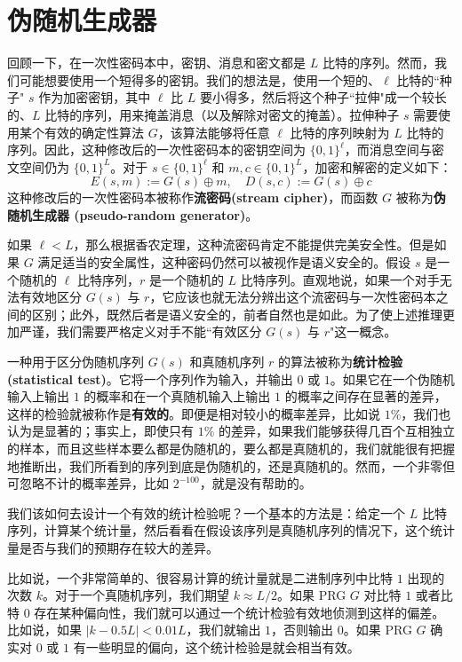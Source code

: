 \section{伪随机生成器}\label{sec:3-1}

回顾一下，在一次性密码本中，密钥、消息和密文都是 $L$ 比特的序列。然而，我们可能想要使用一个短得多的密钥。我们的想法是，使用一个短的、$\ell$ 比特的``种子" $s$ 作为加密密钥，其中 $\ell$ 比 $L$ 要小得多，然后将这个种子``拉伸"成一个较长的、$L$ 比特的序列，用来掩盖消息（以及解除对密文的掩盖）。拉伸种子 $s$ 需要使用某个有效的确定性算法 $G$，该算法能够将任意 $\ell$ 比特的序列映射为 $L$ 比特的序列。因此，这种修改后的一次性密码本的密钥空间为 $\{0,1\}^\ell$，而消息空间与密文空间仍为 $\{0,1\}^L$。对于 $s\in\{0,1\}^\ell$ 和 $m,c\in\{0,1\}^L$，加密和解密的定义如下：
\[
E(s,m):=G(s)\oplus m,\quad
D(s,c):=G(s)\oplus c
\]
这种修改后的一次性密码本被称作\textbf{流密码(stream cipher)}，而函数 $G$ 被称为\textbf{伪随机生成器 (pseudo-random generator)}。

如果 $\ell<L$，那么根据香农定理，这种流密码肯定不能提供完美安全性。但是如果 $G$ 满足适当的安全属性，这种密码仍然可以被视作是语义安全的。假设 $s$ 是一个随机的 $\ell$ 比特序列，$r$ 是一个随机的 $L$ 比特序列。直观地说，如果一个对手无法有效地区分 $G(s)$ 与 $r$，它应该也就无法分辨出这个流密码与一次性密码本之间的区别；此外，既然后者是语义安全的，前者自然也是如此。为了使上述推理更加严谨，我们需要严格定义对手不能``有效区分 $G(s)$ 与 $r$"这一概念。

一种用于区分伪随机序列 $G(s)$ 和真随机序列 $r$ 的算法被称为\textbf{统计检验(statistical test)}。它将一个序列作为输入，并输出 $0$ 或 $1$。如果它在一个伪随机输入上输出 $1$ 的概率和在一个真随机输入上输出 $1$ 的概率之间存在显著的差异，这样的检验就被称作是\textbf{有效的}。即便是相对较小的概率差异，比如说 $1\%$，我们也认为是显著的；事实上，即使只有 $1\%$ 的差异，如果我们能够获得几百个互相独立的样本，而且这些样本要么都是伪随机的，要么都是真随机的，我们就能很有把握地推断出，我们所看到的序列到底是伪随机的，还是真随机的。然而，一个非零但可忽略不计的概率差异，比如 $2^{-100}$，就是没有帮助的。

我们该如何去设计一个有效的统计检验呢？一个基本的方法是：给定一个 $L$ 比特序列，计算某个统计量，然后看看在假设该序列是真随机序列的情况下，这个统计量是否与我们的预期存在较大的差异。

比如说，一个非常简单的、很容易计算的统计量就是二进制序列中比特 $1$ 出现的次数 $k$。对于一个真随机序列，我们期望 $k\approx L/2$。如果 PRG $G$ 对比特 $1$ 或者比特 $0$ 存在某种偏向性，我们就可以通过一个统计检验有效地侦测到这样的偏差。比如说，如果 $|k-0.5L|<0.01L$，我们就输出 $1$，否则输出 $0$。如果 PRG $G$ 确实对 $0$ 或 $1$ 有一些明显的偏向，这个统计检验是就会相当有效。

